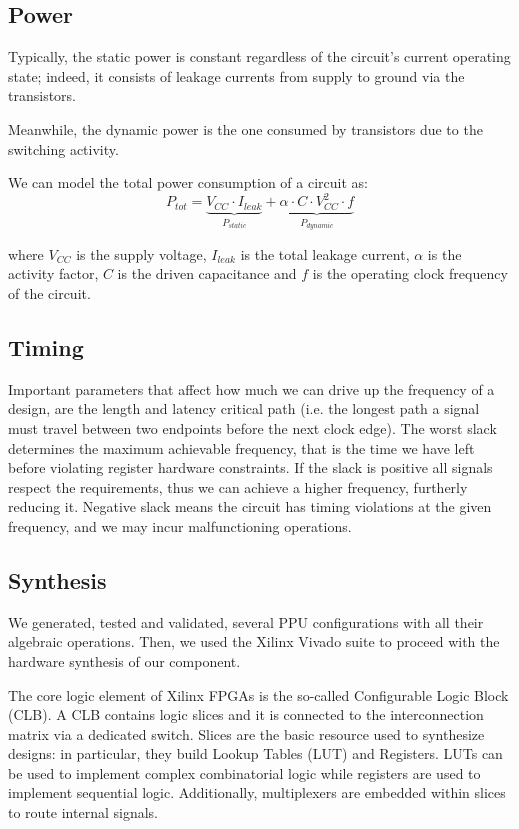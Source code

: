 \subsection{Power}
Typically, the static power is constant regardless of the circuit's current operating state; indeed, it consists of leakage currents from supply to ground via the transistors.

Meanwhile, the dynamic power is the one consumed by transistors due to the switching activity.

We can model the total power consumption of a circuit as:
\begin{equation}\label{equ:power_cmos_equation}
P_{tot} = \underbrace{V_{CC} \cdot I_{leak}}_{P_{static}} + \underbrace{\alpha \cdot C \cdot V_{CC}^2 \cdot f}_{P_{dynamic}}
\end{equation}

where $V_{CC}$ is the supply voltage, $I_{leak}$ is the total leakage current, $\alpha$ is the activity factor, $C$ is the driven capacitance and $f$ is the operating clock frequency of the circuit.



\subsection{Timing}
Important parameters that affect how much we can drive up the frequency of a design, are the length and latency critical path (i.e. the longest path a signal must travel between two endpoints before the next clock edge).
The worst slack determines the maximum achievable frequency, that is the time we have left before violating register hardware constraints.
If the slack is positive all signals respect the requirements, thus we can achieve a higher frequency, furtherly reducing it. Negative slack means the circuit has timing violations at the given frequency, and we may incur malfunctioning operations.

\subsection{Synthesis}

We generated, tested and validated, several PPU configurations with all their algebraic operations. Then, we used the Xilinx Vivado suite to proceed with the hardware synthesis of our component.




The core logic element of Xilinx FPGAs is the so-called Configurable Logic Block (CLB). A CLB contains logic slices and it is connected to the interconnection matrix via a dedicated switch. Slices are the basic resource used to synthesize designs: in particular, they build Lookup Tables (LUT) and Registers. LUTs can be used to implement complex combinatorial logic while registers are used to implement sequential logic. Additionally, multiplexers are embedded within slices to route internal signals.

